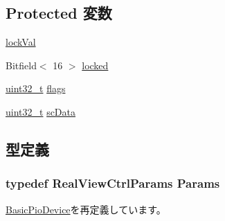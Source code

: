 \subsection*{Protected 変数}
\begin{DoxyCompactItemize}
\item 
\hyperlink{classRealViewCtrl_ae8f7fca2ef5c09642e5b3c139a801fc7}{lockVal}
\item 
Bitfield$<$ 16 $>$ \hyperlink{classRealViewCtrl_adab6c58ba2af3a3cc09a54eff7f8375c}{locked}
\item 
\hyperlink{Type_8hh_a435d1572bf3f880d55459d9805097f62}{uint32\_\-t} \hyperlink{classRealViewCtrl_a773b39d480759f67926cb18ae2219281}{flags}
\item 
\hyperlink{Type_8hh_a435d1572bf3f880d55459d9805097f62}{uint32\_\-t} \hyperlink{classRealViewCtrl_af51d9af9e3bf83cfd7a291d1eedd9176}{scData}
\end{DoxyCompactItemize}


\subsection{型定義}
\hypertarget{classRealViewCtrl_a7bb0551c15e75a5df04d65454bcb45dc}{
\subsubsection[{Params}]{\setlength{\rightskip}{0pt plus 5cm}typedef RealViewCtrlParams {\bf Params}}}
\label{classRealViewCtrl_a7bb0551c15e75a5df04d65454bcb45dc}


\hyperlink{classBasicPioDevice_a2845515ac6467f10540747053c8a0449}{BasicPioDevice}を再定義しています。

